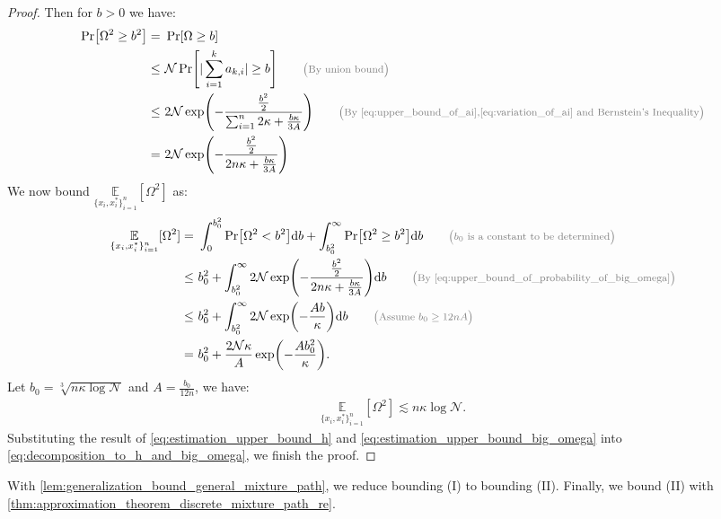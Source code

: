 \documentclass[12pt]{article}
\numberwithin{equation}{section}
\DeclareMathOperator*{\E}{{\mathbb{E}}}
\def\E{\mathbb{E}}
\theoremstyle{theoremstyle}
\numberwithin{equation}{section}
\numberwithin{theorem}{section}
\numberwithin{proposition}{section}
\numberwithin{definition}{section}
\numberwithin{lemma}{section}
\numberwithin{assumption}{section}
\numberwithin{remark}{section}
\newcommand*{\annot}[1]{\tag*{\footnotesize{\textcolor{black!50}{\big(#1\big)}}}}
\begin{document}
\begin{proof}
Then for $b>0$ we have:
\begin{align}
    \Pr[\Omega^2\geq b^2] = & ~
    \Pr[\Omega\geq b]\\
    \leq & ~
    \mathcal{N}\Pr[|\sum_{i=1}^ka_{k,i}|\geq b] \annot{By union bound}\\
    \leq & ~
    2\mathcal{N}\exp(-\frac{\frac{b^2}{2}}{\sum_{i=1}^n 2\kappa+\frac{b\kappa}{3A}}) \annot{By  \eqref{eq:upper_bound_of_ai},\eqref{eq:variation_of_ai} and Bernstein's Inequality}\\
    = & ~
    \label{eq:upper_bound_of_probability_of_big_omega}
    2\mathcal{N}\exp(-\frac{\frac{b^2}{2}}{  2n\kappa+\frac{b\kappa}{3A}})
\end{align}
We now bound $\underset{\{x_i,x_i^*\}_{i=1}^n}{\E}[\Omega^2]$ as:
\begin{align*}
    \underset{\{x_i,x_i^*\}_{i=1}^n}{\E}[\Omega^2] 
    = & ~
    \int_0^{b_0^2} \Pr[\Omega^2< b^2] \dd b+ \int_{b_0^2}^\infty \Pr[\Omega^2\geq b^2] \dd b \annot{$b_0$ is a constant to be determined}\\
    \leq & ~
    b_0^2+\int_{b_0^2}^\infty 2\mathcal{N}\exp(-\frac{\frac{b^2}{2}}{  2n\kappa+\frac{b\kappa}{3A}}) \dd b \annot{By \eqref{eq:upper_bound_of_probability_of_big_omega}} \\
    \leq & ~
    b_0^2+\int_{b_0^2}^\infty 2\mathcal{N}\exp(-\frac{Ab}{  \kappa}) \dd b \annot{Assume $b_0\geq12nA$} \\
    = & ~
    b_0^2+\frac{2\mathcal{N}\kappa}{A}\exp(-\frac{Ab_0^2}{\kappa}).
\end{align*}
Let $b_0=\sqrt[3]{n\kappa\log\mathcal{N}}$ and $A=\frac{b_0}{12n}$, we have:
\begin{align}\label{eq:estimation_upper_bound_big_omega}
    \underset{\{x_i,x_i^*\}_{i=1}^n}{\E}[\Omega^2]\lesssim n\kappa\log\mathcal{N}.
\end{align}
Substituting the result of \eqref{eq:estimation_upper_bound_h} and \eqref{eq:estimation_upper_bound_big_omega} into \eqref{eq:decomposition_to_h_and_big_omega}, we finish the proof.
\end{proof}

With \cref{lem:generalization_bound_general_mixture_path}, we reduce bounding (I) to bounding (II).
Finally, we bound (II) with \cref{thm:approximation_theorem_discrete_mixture_path_re}.
\end{document}
